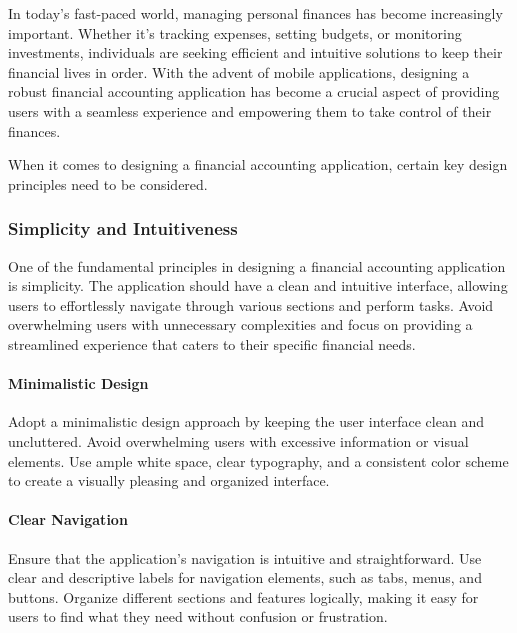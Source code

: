 

In today's fast-paced world, managing personal finances has become increasingly important. Whether it's tracking 
expenses, setting budgets, or monitoring investments, individuals are seeking efficient and intuitive solutions to 
keep their financial lives in order. With the advent of mobile applications, designing a robust financial accounting 
application has become a crucial aspect of providing users with a seamless experience and empowering them to take 
control of their finances.

When it comes to designing a financial accounting application, certain key design principles need to be considered. 

\subsubsection{Simplicity and Intuitiveness}
One of the fundamental principles in designing a financial accounting application is simplicity. The application 
should have a clean and intuitive interface, allowing users to effortlessly navigate through various sections and 
perform tasks. Avoid overwhelming users with unnecessary complexities and focus on providing a streamlined experience 
that caters to their specific financial needs.

\paragraph{Minimalistic Design}
Adopt a minimalistic design approach by keeping the user interface clean and uncluttered. 
Avoid overwhelming users with excessive information or visual elements. Use ample white space, clear typography, 
and a consistent color scheme to create a visually pleasing and organized interface.

\paragraph{Clear Navigation}
Ensure that the application's navigation is intuitive and straightforward. Use clear and 
descriptive labels for navigation elements, such as tabs, menus, and buttons. Organize different sections and 
features logically, making it easy for users to find what they need without confusion or frustration.

